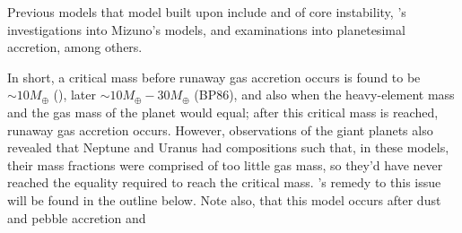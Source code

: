 \documentclass[11pt]{report}
\begin{document}
\begin{mainf}
\begin{sloppypar}
Previous models that \citealp{Pollack1996} model built upon include \citealp{Mizuno1978} and \citealp{Mizuno1980} of core instability, \citealp{Bodenheimer1986}'s investigations into Mizuno's models,
\citealp{Pollack1986} and \citealp{Podolak1988} examinations into planetesimal accretion, among others.

In short, a critical mass before runaway gas accretion occurs is found to be $\sim 10M_\oplus$ (\citealp{Mizuno1980}), later $\sim 10M_\oplus - 30M_\oplus$ (BP86), and also when the heavy-element mass
and the gas mass of the planet would equal; after this critical mass is reached, runaway gas accretion occurs. However, observations of the giant planets also revealed that Neptune and Uranus had compositions such that, 
in these models, their mass fractions were comprised of too little gas mass, so they'd have never reached the equality required to reach the critical mass. \citealp{Pollack1996}'s remedy to this issue
will be found in the outline below. Note also, that this model occurs after dust and pebble accretion and 
\end{sloppypar}



\end{mainf}
\end{document}
